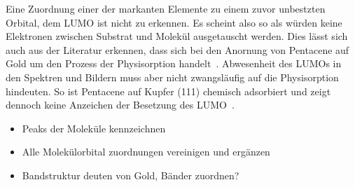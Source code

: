         Eine Zuordnung einer der markanten Elemente zu einem zuvor unbestzten Orbital, dem LUMO ist nicht zu erkennen.
        Es scheint also so als würden keine Elektronen zwischen Substrat und Molekül ausgetauscht werden. 
        Dies lässt sich auch aus der Literatur erkennen, dass sich bei den Anornung von Pentacene auf Gold um den Prozess der Physisorption handelt~\cite{5A_4}.
        Abwesenheit des LUMOs in den Spektren und Bildern muss aber nicht zwangsläufig auf die Physisorption hindeuten.
        So ist Pentacene auf Kupfer (111) chemisch adsorbiert und zeigt dennoch keine Anzeichen der Besetzung des LUMO~\cite{koch_adsorption-induced_2008}.
        \begin{itemize}
            \item Peaks der Moleküle kennzeichnen
            \item Alle Molekülorbital zuordnungen vereinigen und ergänzen
            \item Bandstruktur deuten von Gold, Bänder zuordnen?
        \end{itemize}

        
